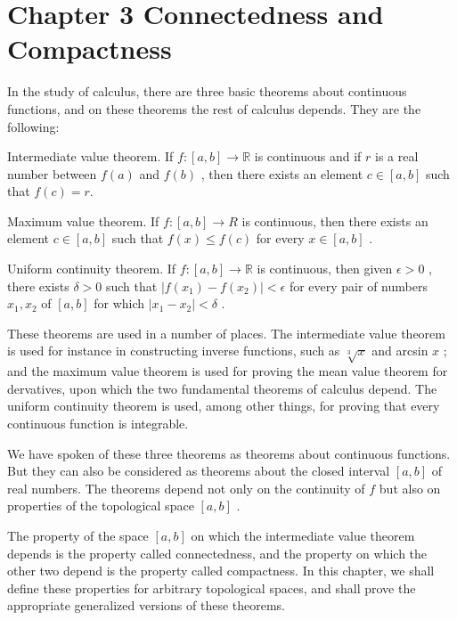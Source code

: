 \documentclass[10pt]{article}
\begin{document}
\section*{Chapter 3 Connectedness and Compactness}

In the study of calculus, there are three basic theorems about continuous functions, and on these theorems the rest of calculus depends. They are the following:

Intermediate value theorem. If \(f : \left\lbrack  {a,b}\right\rbrack   \rightarrow  \mathbb{R}\) is continuous and if \(r\) is a real number between \(f\left( a\right)\) and \(f\left( b\right)\) , then there exists an element \(c \in  \left\lbrack  {a,b}\right\rbrack\) such that \(f\left( c\right)  = r.\)

Maximum value theorem. If \(f : \left\lbrack  {a,b}\right\rbrack   \rightarrow  R\) is continuous, then there exists an element \(c \in  \left\lbrack  {a,b}\right\rbrack\) such that \(f\left( x\right)  \leq  f\left( c\right)\) for every \(x \in  \left\lbrack  {a,b}\right\rbrack\) .

Uniform continuity theorem. If \(f : \left\lbrack  {a,b}\right\rbrack   \rightarrow  \mathbb{R}\) is continuous, then given \(\epsilon  > 0\) , there exists \(\delta  > 0\) such that \(\left| {f\left( {x}_{1}\right)  - f\left( {x}_{2}\right) }\right|  < \epsilon\) for every pair of numbers \({x}_{1},{x}_{2}\) of \(\left\lbrack  {a,b}\right\rbrack\) for which \(\left| {{x}_{1} - {x}_{2}}\right|  < \delta\) .

These theorems are used in a number of places. The intermediate value theorem is used for instance in constructing inverse functions, such as \(\sqrt[3]{x}\) and arcsin \(x\) ; and the maximum value theorem is used for proving the mean value theorem for dervatives, upon which the two fundamental theorems of calculus depend. The uniform continuity theorem is used, among other things, for proving that every continuous function is integrable.

We have spoken of these three theorems as theorems about continuous functions. But they can also be considered as theorems about the closed interval \(\left\lbrack  {a,b}\right\rbrack\) of real numbers. The theorems depend not only on the continuity of \(f\) but also on properties of the topological space \(\left\lbrack  {a,b}\right\rbrack\) .

The property of the space \(\left\lbrack  {a,b}\right\rbrack\) on which the intermediate value theorem depends is the property called connectedness, and the property on which the other two depend is the property called compactness. In this chapter, we shall define these properties for arbitrary topological spaces, and shall prove the appropriate generalized versions of these theorems.
\end{document}
